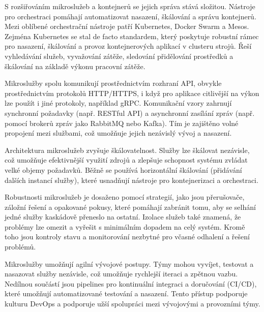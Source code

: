 
S rozšiřováním mikroslužeb a kontejnerů se jejich správa stává složitou. Nástroje pro orchestraci pomáhají automatizovat nasazení, škálování a správu kontejnerů. Mezi oblíbené orchestrační nástroje patří Kubernetes, Docker Swarm a Mesos. Zejména Kubernetes se stal de facto standardem, který poskytuje robustní rámec pro nasazení, škálování a provoz kontejnerových aplikací v clusteru strojů. Řeší vyhledávání služeb, vyvažování zátěže, sledování přidělování prostředků a škálování na základě výkonu pracovní zátěže.



Mikroslužby spolu komunikují prostřednictvím rozhraní API, obvykle prostřednictvím protokolů HTTP/HTTPS, i když pro aplikace citlivější na výkon lze použít i jiné protokoly, například gRPC. Komunikační vzory zahrnují synchronní požadavky (např. RESTful API) a asynchronní zasílání zpráv (např. pomocí brokerů zpráv jako RabbitMQ nebo Kafka). Tím je zajištěno volné propojení mezi službami, což umožňuje jejich nezávislý vývoj a nasazení.


Architektura mikroslužeb zvyšuje škálovatelnost. Služby lze škálovat nezávisle, což umožňuje efektivnější využití zdrojů a zlepšuje schopnost systému zvládat velké objemy požadavků. Běžně se používá horizontální škálování (přidávání dalších instancí služby), které usnadňují nástroje pro kontejnerizaci a orchestraci.


Robustnosti mikroslužeb je dosaženo pomocí strategií, jako jsou přerušovače, záložní řešení a opakované pokusy, které pomáhají zabránit tomu, aby se selhání jedné služby kaskádově přeneslo na ostatní. Izolace služeb také znamená, že problémy lze omezit a vyřešit s minimálním dopadem na celý systém. Kromě toho jsou kontroly stavu a monitorování nezbytné pro včasné odhalení a řešení problémů.


Mikroslužby umožňují agilní vývojové postupy. Týmy mohou vyvíjet, testovat a nasazovat služby nezávisle, což umožňuje rychlejší iteraci a zpětnou vazbu. Nedílnou součástí jsou pipelines pro kontinuální integraci a doručování (CI/CD), které umožňují automatizované testování a nasazení. Tento přístup podporuje kulturu DevOps a podporuje užší spolupráci mezi vývojovými a provozními týmy.

